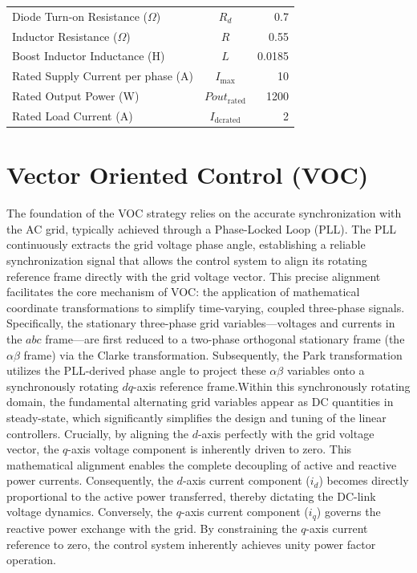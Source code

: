 \begin{table}[H]
\begin{tabular}{l c r}
		Diode Turn-on Resistance ($\Omega$)   & $R_d$                &0.7  \\

		\addlinespace[2pt]

		Inductor Resistance ($\Omega$)          & $R$                &0.55  \\

		Boost Inductor Inductance (H)               & $L$                &0.0185  \\

		Rated Supply Current per phase (A)                     & $I_{\mathrm{max}}$ &10 \\

		Rated Output Power (W)                   & $Pout_{\mathrm{rated}}$ &1200  \\

		Rated Load Current (A)                   & $I_{\mathrm{dcrated}}$ &2  \\

		\bottomrule

	\end{tabular}

\end{table}



\section{Vector Oriented Control (VOC)}
The foundation of the VOC strategy relies on the accurate synchronization with the AC grid, typically achieved through a Phase-Locked Loop (PLL). The PLL continuously extracts the grid voltage phase angle, establishing a reliable synchronization signal that allows the control system to align its rotating reference frame directly with the grid voltage vector. This precise alignment facilitates the core mechanism of VOC: the application of mathematical coordinate transformations to simplify time-varying, coupled three-phase signals. Specifically, the stationary three-phase grid variables—voltages and currents in the $abc$ frame—are first reduced to a two-phase orthogonal stationary frame (the $\alpha\beta$ frame) via the Clarke transformation. Subsequently, the Park transformation utilizes the PLL-derived phase angle to project these $\alpha\beta$ variables onto a synchronously rotating $dq$-axis reference frame.Within this synchronously rotating domain, the fundamental alternating grid variables appear as DC quantities in steady-state, which significantly simplifies the design and tuning of the linear controllers. Crucially, by aligning the $d$-axis perfectly with the grid voltage vector, the $q$-axis voltage component is inherently driven to zero. This mathematical alignment enables the complete decoupling of active and reactive power currents. Consequently, the $d$-axis current component ($i_d$) becomes directly proportional to the active power transferred, thereby dictating the DC-link voltage dynamics. Conversely, the $q$-axis current component ($i_q$) governs the reactive power exchange with the grid. By constraining the $q$-axis current reference to zero, the control system inherently achieves unity power factor operation.

